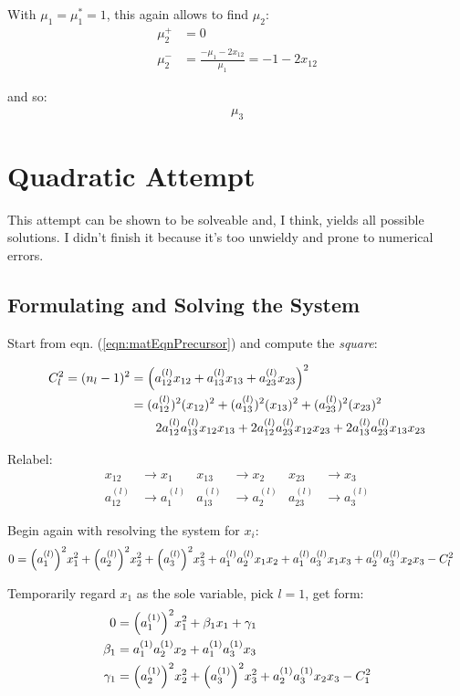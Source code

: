 \documentclass[
	english,
	a4paper,
	fontsize=10pt,
	parskip=half,
	titlepage=true,
	DIV=12,
	final
]{scrreprt}
\newcommand*{\thus}{\ensuremath{\rightarrow}\xspace}
\begin{document}
With $\mu_1 = \mu_1^* = 1$, this again allows to find $\mu_2$:
\begin{align}
	\mu_2^+ &= 0 \\
	\mu_2^- &= \frac{-\mu_1 - 2 x_{12}}{\mu_1} = -1 - 2 x_{12}
\end{align}

and so:
\begin{align}
	\mu_3
\end{align}

\section{Quadratic Attempt}
{\color{blue} This attempt can be shown to be solveable and, I think, yields all possible solutions. I didn't finish it because it's too unwieldy and prone to numerical errors.}

\subsection{Formulating and Solving the System}
Start from eqn. (\ref{eqn:matEqnPrecursor}) and compute the \emph{square}:

\begin{align}
	C_l^2
=
	(n_l - 1)^2
&=
	\qty( \big.
	a^{(l)}_{12} x_{12} +
	a^{(l)}_{13} x_{13} +
	a^{(l)}_{23} x_{23}
	)^2 \\
&=
	\nonumber
	(a^{(l)}_{12})^2 (x_{12})^2 +
	(a^{(l)}_{13})^2 (x_{13})^2 +
	(a^{(l)}_{23})^2 (x_{23})^2 \\
	&\qquad
	2 a^{(l)}_{12} a^{(l)}_{13} x_{12} x_{13} +
	2 a^{(l)}_{12} a^{(l)}_{23} x_{12} x_{23} +
	2 a^{(l)}_{13} a^{(l)}_{23} x_{13} x_{23}
\end{align}

Relabel:
\begin{align*}
	x_{12} &\thus x_1 &
	x_{13} &\thus x_2 &
	x_{23} &\thus x_3
\\
	a_{12}^{(l)} &\thus a_1^{(l)} &
	a_{13}^{(l)} &\thus a_2^{(l)} &
	a_{23}^{(l)} &\thus a_3^{(l)}
\end{align*}

Begin again with resolving the system for $x_i$:
\begin{align}
	0
&=
	\qty(a_1^{(l)})^2 x_1^2 +
	\qty(a_2^{(l)})^2 x_2^2 +
	\qty(a_3^{(l)})^2 x_3^2 +
	a_1^{(l)}a_2^{(l)} x_1 x_2 +
	a_1^{(l)}a_3^{(l)} x_1 x_3 +
	a_2^{(l)}a_3^{(l)} x_2 x_3 -
	C_l^2
	\label{eqn:sysQuadratic}
\end{align}

Temporarily regard $x_1$ as the sole variable, pick $l=1$, get form:
\begin{align}
	0
&=
	\qty(a_1^{(1)})^2 x_1^2 +
	\beta_1 x_1 +
	\gamma_1
\\
	\beta_1
&=
	a_1^{(1)}a_2^{(1)} x_2 +
	a_1^{(1)}a_3^{(1)} x_3
\\
	\gamma_1
&=
	\qty(a_2^{(1)})^2 x_2^2 +
	\qty(a_3^{(1)})^2 x_3^2 +
	a_2^{(1)}a_3^{(1)} x_2 x_3 -
	C_1^2
\end{align}
\end{document}
